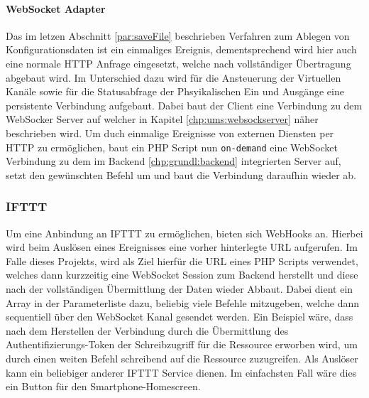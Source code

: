 \paragraph{WebSocket Adapter}
Das im letzen Abschnitt \ref {par:saveFile} beschrieben Verfahren zum Ablegen von Konfigurationsdaten ist ein einmaliges Ereignis, dementsprechend wird hier auch eine normale HTTP Anfrage eingesetzt, welche nach vollständiger Übertragung abgebaut wird. Im Unterschied dazu wird für die Ansteuerung der Virtuellen Kanäle sowie für die Statusabfrage der Phsyikalischen Ein und Ausgänge eine persistente Verbindung aufgebaut. Dabei baut der Client eine Verbindung zu dem WebSocker Server auf welcher in Kapitel \ref{chp:ums:websockserver} näher beschrieben wird. Um duch einmalige Ereignisse von externen Diensten per HTTP zu ermöglichen, baut ein PHP Script nun \texttt{on-demand} eine WebSocket Verbindung zu dem im Backend \ref{chp:grundl:backend} integrierten Server auf, setzt den gewünschten Befehl um und baut die Verbindung daraufhin wieder ab. 

\subsubsection{IFTTT}
Um eine Anbindung an IFTTT zu ermöglichen, bieten sich WebHooks an. Hierbei wird beim Auslösen eines Ereignisses eine vorher hinterlegte URL aufgerufen. Im Falle dieses Projekts, wird als Ziel hierfür die URL eines PHP Scripts verwendet, welches dann kurzzeitig eine WebSocket Session zum Backend herstellt und diese nach der vollständigen Übermittlung der Daten wieder Abbaut. Dabei dient ein Array in der Parameterliste dazu, beliebig viele Befehle mitzugeben, welche dann sequentiell über den WebSocket Kanal gesendet werden. Ein Beispiel wäre, dass nach dem Herstellen der Verbindung durch die Übermittlung des Authentifizierungs-Token der Schreibzugriff für die Ressource erworben wird, um durch einen weiten Befehl schreibend auf die Ressource zuzugreifen. Als Auslöser kann ein beliebiger anderer IFTTT Service dienen. Im einfachsten Fall wäre dies ein Button für den Smartphone-Homescreen.  



\clearpage


